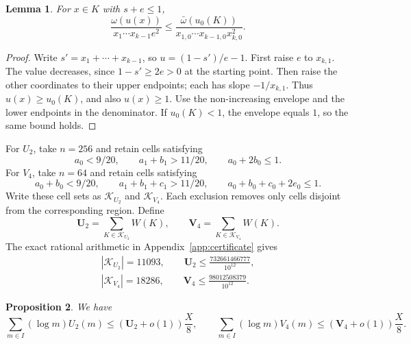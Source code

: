 \documentclass{amsart}
\newtheorem{lemma}{Lemma}[section]
\newtheorem{proposition}[lemma]{Proposition}
\numberwithin{equation}{section}
\numberwithin{table}{section}
\begin{document}
\begin{lemma}\label{lem:rectangle}
For $x\in K$ with $s+e\le1$,
\[
\frac{\omega(u(x))}{x_1\cdots x_{k-1}e^2}
\le
\frac{\bar\omega(u_0(K))}
{x_{1,0}\cdots x_{k-1,0}x_{k,0}^2}.
\]
\end{lemma}

\begin{proof}
Write $s'=x_1+\cdots+x_{k-1}$, so $u=(1-s')/e-1$.
First raise $e$ to $x_{k,1}$. The value decreases, since
$1-s'\ge2e>0$ at the starting point. Then raise the other coordinates to
their upper endpoints; each has slope $-1/x_{k,1}$.
Thus $u(x)\ge u_0(K)$, and also $u(x)\ge1$.
Use the non-increasing envelope and the lower endpoints in the denominator.
If $u_0(K)<1$, the envelope equals $1$, so the same bound holds.
\end{proof}

For $U_2$, take $n=256$ and retain cells satisfying
\begin{equation}\label{eq:U2-cell-tests}
a_0<9/20,\qquad a_1+b_1>11/20,\qquad a_0+2b_0\le1.
\end{equation}
For $V_4$, take $n=64$ and retain cells satisfying
\begin{equation}\label{eq:V4-cell-tests}
a_0+b_0<9/20,\qquad a_1+b_1+c_1>11/20,\qquad
a_0+b_0+c_0+2e_0\le1.
\end{equation}
Write these cell sets as $\mathcal K_{U_2}$ and $\mathcal K_{V_4}$.
Each exclusion removes only cells disjoint from the corresponding region.
Define
\begin{equation}\label{eq:cell-sums}
\mathbf U_2=\sum_{K\in\mathcal K_{U_2}}W(K),\qquad
\mathbf V_4=\sum_{K\in\mathcal K_{V_4}}W(K).
\end{equation}
The exact rational arithmetic in Appendix~\ref{app:certificate} gives
\begin{equation}\label{eq:cell-certificates}
\begin{gathered}
|\mathcal K_{U_2}|=11093,\qquad
\mathbf U_2\le\frac{732661466777}{10^{12}},\\
|\mathcal K_{V_4}|=18286,\qquad
\mathbf V_4\le\frac{98012508379}{10^{12}}.
\end{gathered}
\end{equation}

\begin{proposition}\label{prop:rectangle-losses}
We have
\begin{equation}
\sum_{m\in I}(\log m)U_2(m)\le(\mathbf U_2+o(1))\frac X8,
\qquad
\sum_{m\in I}(\log m)V_4(m)\le(\mathbf V_4+o(1))\frac X8.
\end{equation}
\end{proposition}
\end{document}
